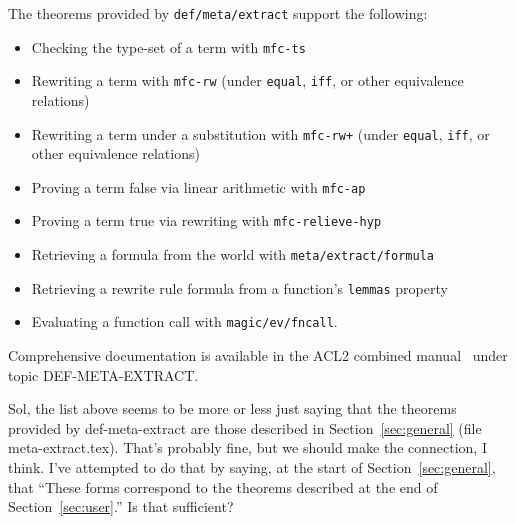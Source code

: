 The theorems provided by \texttt{def\-/meta\-/extract} support the following:
\begin{itemize}
\item Checking the type-set of a term with \texttt{mfc-ts}
\item Rewriting a term with \texttt{mfc-rw}
  (under \texttt{equal}, \texttt{iff}, or other equivalence relations)
\item Rewriting a term under a substitution with \texttt{mfc-rw+}
  (under \texttt{equal}, \texttt{iff}, or other equivalence relations)
\item Proving a term false via linear arithmetic with \texttt{mfc-ap}
\item Proving a term true via rewriting with \texttt{mfc-relieve-hyp}
\item Retrieving a formula from the world with \texttt{meta\-/extract\-/formula}
\item Retrieving a rewrite rule formula from a function's \texttt{lemmas} property
\item Evaluating a function call with \texttt{magic\-/ev\-/fncall}.
\end{itemize}
Comprehensive documentation is available in the ACL2 combined
manual~\cite{acl2:doc} under topic DEF-META-EXTRACT.

\begin{mycomment}
Sol, the list above seems to be more or less just
  saying that the theorems provided by def-meta-extract are those
  described in Section~\ref{sec:general} (file meta-extract.tex).
  That's probably fine, but we should make the connection, I think.
  I've attempted to do that by saying, at the start of
  Section~\ref{sec:general}, that ``These forms correspond to the
  theorems described at the end of Section~\ref{sec:user}.''  Is that
  sufficient?
\end{mycomment}
